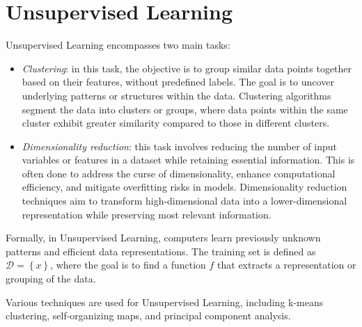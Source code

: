 \section{Unsupervised Learning}

Unsupervised Learning encompasses two main tasks:
\begin{itemize}
    \item \textit{Clustering}: in this task, the objective is to group similar data points together based on their features, without predefined labels. 
        The goal is to uncover underlying patterns or structures within the data. 
        Clustering algorithms segment the data into clusters or groups, where data points within the same cluster exhibit greater similarity compared to those in different clusters. 
    \item \textit{Dimensionality reduction}: this task involves reducing the number of input variables or features in a dataset while retaining essential information. 
        This is often done to address the curse of dimensionality, enhance computational efficiency, and mitigate overfitting risks in models. 
        Dimensionality reduction techniques aim to transform high-dimensional data into a lower-dimensional representation while preserving most relevant information.
\end{itemize}
Formally, in Unsupervised Learning, computers learn previously unknown patterns and efficient data representations.
The training set is defined as $\mathcal{D}=\left\{ x \right\}$, where the goal is to find a function $f$ that extracts a representation or grouping of the data.

Various techniques are used for Unsupervised Learning, including k-means clustering, self-organizing maps, and principal component analysis.